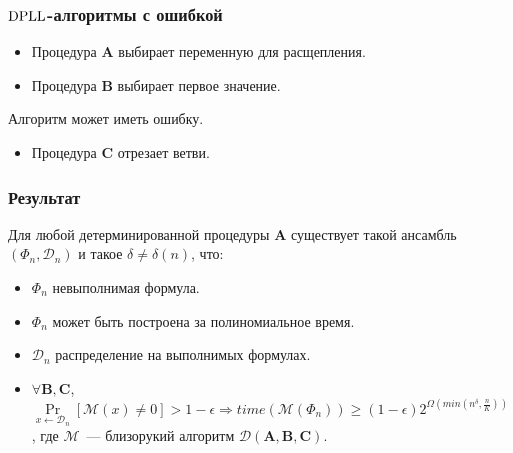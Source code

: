 \begin{frame}
	\frametitle{$\mathrm{DPLL}$-алгоритмы с ошибкой}

   	
    
	\pause
    \pause
    \pause
    \pause
    \pause
    \begin{itemize}
        \item Процедура $\mathbf{A}$ выбирает переменную для расщепления.
    	\pause
	    \item Процедура $\mathbf{B}$ выбирает первое значение.
    \end{itemize}

    \pause
    Алгоритм может иметь ошибку.

    \pause
    \pause
    \begin{itemize}
	    \item Процедура $\mathbf{C}$ отрезает ветви.
    \end{itemize}
\end{frame}


\begin{frame}
	\frametitle{Результат}
	\pause
	\begin{theorem}
        Для любой детерминированной процедуры $\mathbf{A}$ существует такой ансамбль $(\Phi_n, \mathcal{D}_n)$ и такое $\delta \ne
        \delta(n)$, что:
        \pause
		\begin{itemize}
            \item $\Phi_n$ невыполнимая формула.
        	\item $\Phi_n$ может быть построена за полиномиальное время.
            \pause
            \item $\mathcal{D}_n$ распределение на выполнимых формулах.
            \pause
			\item $\forall \mathbf{B}, \mathbf{C}$,
				$\Pr\limits_{x \gets \mathcal{D}_n}[\mathcal{M}(x)
                \ne 0] > 1 - \epsilon \Rightarrow
                time(\mathcal{M}(\Phi_n)) \ge (1 - \epsilon) 2^{\Omega(min(n^\delta, \frac{n}{K}))}$, где $\mathcal{M}$~---
                близорукий алгоритм $\mathcal{D}(\mathbf{A}, \mathbf{B},\mathbf{C})$.
		\end{itemize}
	\end{theorem}
\end{frame}


